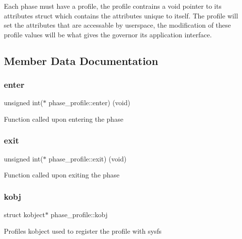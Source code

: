 Each phase must have a profile, the profile contrains a void pointer to its attributes struct which contains the attributes unique to itself. The profile will set the attributes that are accessable by userspace, the modification of these profile values will be what gives the governor its application interface. 

\subsection{Member Data Documentation}
\mbox{\label{structphase__profile_a53beff5bbbc84cbb5c3e5e1dd48593c1}} 
\subsubsection{\texorpdfstring{enter}{enter}}
{\footnotesize\ttfamily unsigned int($\ast$ phase\+\_\+profile\+::enter) (void)}

Function called upon entering the phase \mbox{\label{structphase__profile_a9c942d0c12f12afd5503ddd40498dd5d}} 
\subsubsection{\texorpdfstring{exit}{exit}}
{\footnotesize\ttfamily unsigned int($\ast$ phase\+\_\+profile\+::exit) (void)}

Function called upon exiting the phase \mbox{\label{structphase__profile_ad75ce163887fd0964c147e23a155e7ab}} 
\subsubsection{\texorpdfstring{kobj}{kobj}}
{\footnotesize\ttfamily struct kobject$\ast$ phase\+\_\+profile\+::kobj}

Profiles kobject used to register the profile with sysfs \mbox{\label{structphase__profile_a7ba32c8fdbf80efc580c6df57d0ec433}} 

